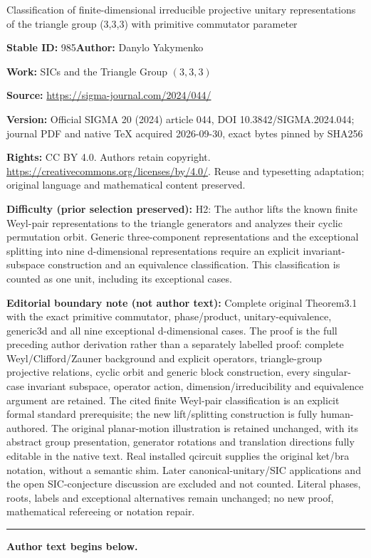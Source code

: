\documentclass[11pt]{article}
\numberwithin{equation}{section}
\numberwithin{equation}{section}
\begin{document}
\begin{center}\Large Classification of finite-dimensional irreducible projective unitary representations of the triangle group (3,3,3) with primitive commutator parameter\end{center}
\noindent\textbf{Stable ID:} 985\quad\textbf{Author:} Danylo Yakymenko\par
\noindent\textbf{Work:} SICs and the Triangle Group $(3,3,3)$\par
\noindent\textbf{Source:} \url{https://sigma-journal.com/2024/044/}\par
\noindent\textbf{Version:} Official SIGMA 20 (2024) article 044, DOI 10.3842/SIGMA.2024.044; journal PDF and native TeX acquired 2026-09-30, exact bytes pinned by SHA256\par
\noindent\textbf{Rights:} CC BY 4.0. Authors retain copyright. \url{https://creativecommons.org/licenses/by/4.0/}. Reuse and typesetting adaptation; original language and mathematical content preserved.\par
\noindent\textbf{Difficulty (prior selection preserved):} {\CJKfont H2: The author lifts the known finite Weyl-pair representations to the triangle generators and analyzes their cyclic permutation orbit. Generic three-component representations and the exceptional splitting into nine d-dimensional representations require an explicit invariant-subspace construction and an equivalence classification. This classification is counted as one unit, including its exceptional cases.}\par
\medskip\noindent\textbf{Editorial boundary note (not author text):} Complete original Theorem3.1 with the exact primitive commutator, phase/product, unitary-equivalence, generic3d and all nine exceptional d-dimensional cases. The proof is the full preceding author derivation rather than a separately labelled proof: complete Weyl/Clifford/Zauner background and explicit operators, triangle-group projective relations, cyclic orbit and generic block construction, every singular-case invariant subspace, operator action, dimension/irreducibility and equivalence argument are retained. The cited finite Weyl-pair classification is an explicit formal standard prerequisite; the new lift/splitting construction is fully human-authored. The original planar-motion illustration is retained unchanged, with its abstract group presentation, generator rotations and translation directions fully editable in the native text. Real installed qcircuit supplies the original ket/bra notation, without a semantic shim. Later canonical-unitary/SIC applications and the open SIC-conjecture discussion are excluded and not counted. Literal phases, roots, labels and exceptional alternatives remain unchanged; no new proof, mathematical refereeing or notation repair.\par
\medskip\hrule\medskip\noindent\textbf{Author text begins below.}\par
\setcounter{section}{1}
\end{document}
